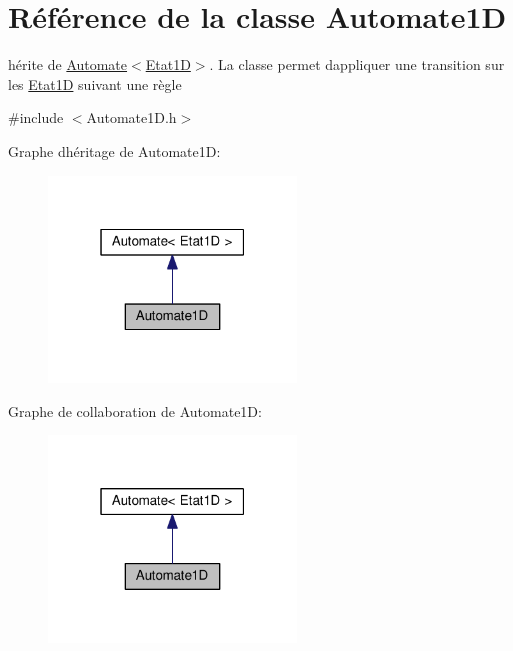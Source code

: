 \hypertarget{class_automate1_d}{}\section{Référence de la classe Automate1D}
\label{class_automate1_d}


hérite de \hyperlink{class_automate}{Automate$<$\+Etat1\+D$>$}. La classe permet d\textquotesingle{}appliquer une transition sur les \hyperlink{class_etat1_d}{Etat1D} suivant une règle  




{\ttfamily \#include $<$Automate1\+D.\+h$>$}



Graphe d\textquotesingle{}héritage de Automate1D\+:\nopagebreak
\begin{figure}[H]
\begin{center}
\leavevmode
\includegraphics[width=187pt]{class_automate1_d__inherit__graph}
\end{center}
\end{figure}


Graphe de collaboration de Automate1D\+:\nopagebreak
\begin{figure}[H]
\begin{center}
\leavevmode
\includegraphics[width=187pt]{class_automate1_d__coll__graph}
\end{center}
\end{figure}
